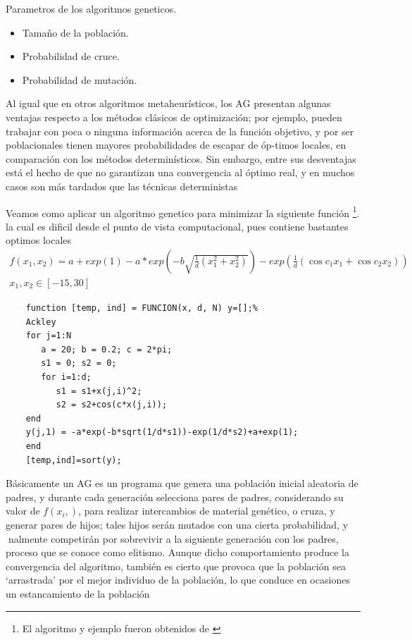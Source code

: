\documentclass{article}
\begin{document}
Parametros de los algoritmos geneticos.
\begin{itemize}
    \item Tamaño de la población.
    \item Probabilidad de cruce.
    \item Probabilidad de mutación.
\end{itemize}

Al igual que en otros algoritmos metaheurísticos, los AG presentan algunas ventajas respecto a los métodos clásicos de optimización; por ejemplo, pueden trabajar con poca o ninguna información acerca de la función objetivo, y por ser poblacionales tienen mayores probabilidades de escapar de óp-timos locales, en comparación con los métodos determinísticos. Sin embargo, entre sus desventajas está el hecho de que no garantizan una convergencia al óptimo real, y en muchos casos son más tardados que las técnicas deterministas

Veamos como aplicar un algoritmo genetico para minimizar la siguiente función \footnote{El algoritmo y ejemplo fueron obtenidos de \cite{Cuevas(2016)}}. la cual es dificil desde el punto de vista computacional, pues contiene bastantes optimos locales 
\begin{align*}
    f(x_1,x_2)=a+exp(1)-a*exp(-b\sqrt{\frac{1}{d}(x_1^2+x_2^2)})-exp(\frac{1}{d}(\cos{c_1x_1}+\cos{c_2x_2})) \\
    x_1,x_2 \in [-15,30]
\end{align*}

\begin{verbatim}
    function [temp, ind] = FUNCION(x, d, N) y=[];% 
    Ackley
    for j=1:N       
       a = 20; b = 0.2; c = 2*pi;   
       s1 = 0; s2 = 0;    
       for i=1:d;        
          s1 = s1+x(j,i)^2;       
          s2 = s2+cos(c*x(j,i));   
    end
    y(j,1) = -a*exp(-b*sqrt(1/d*s1))-exp(1/d*s2)+a+exp(1);
    end
    [temp,ind]=sort(y);
\end{verbatim}

Básicamente un AG es un programa que genera una población inicial aleatoria de padres, y durante cada generación selecciona pares de padres, considerando su valor de $f(x_i,)$, para realizar intercambios de material genético, o cruza, y generar pares de hijos; tales hijos serán mutados con una cierta probabilidad, y nalmente competirán por sobrevivir a la siguiente generación con los padres, proceso que se conoce como elitismo. Aunque dicho comportamiento produce la convergencia del algoritmo, también es cierto que provoca que la población sea ‘arrastrada’ por el mejor individuo de la población, lo que conduce en ocasiones un estancamiento de la población
\end{document}

